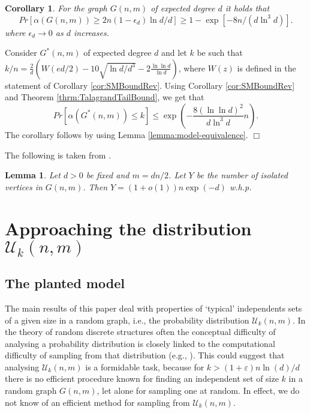 \documentclass[a4paper,10pt]{article}
\makeatletter
\newtheorem{corollary}{Corollary}\renewcommand{\thecorollary}{\arabic{corollary}}
\newtheorem{lemma}{Lemma}\renewcommand{\thelemma}{\arabic{lemma}}
\newenvironment{proof}{\noindent{\bf Proof\@:}}{\hfill $\Box$\\}
\newcommand\cU{\mathcal{U}}
\newcommand\eps{\varepsilon}
\newcommand{\whp}{w.h.p.}
\makeatother
\begin{document}
\begin{corollary}\label{cor:ExistenceGnm}
For the graph $G(n,m)$ of expected degree $d$ it holds that
\begin{displaymath}
Pr\left[\alpha(G(n,m))\geq 2n(1-\epsilon_d){\ln d}/{d} \right]
\geq 1-\exp \left[-{8n}/(d\ln^3 d) \right]. 
\end{displaymath}
where $\epsilon_d\to0$ as $d$ increases.
\end{corollary}
\begin{proof}
Consider $G^*(n,m)$ of expected degree $d$ and let $k$ be such that
$k/n=\frac{2}{d}\left(W(ed/2)-10\sqrt{\ln d/d^3}-2\frac{\ln\ln d}{\ln d}\right)$, 
where $W(z)$ is defined in the statement of Corollary \ref{cor:SMBoundRev}. 
Using Corollary \ref{cor:SMBoundRev} and Theorem \ref{thrm:TalagrandTailBound}, 
we get that
\begin{displaymath}
Pr\left[\alpha(G^*(n,m))\leq k \right] \leq \exp \left(-\frac{8(\ln\ln d)^2}{d\ln^3 d}n \right).
\end{displaymath}
The corollary follows by using Lemma \ref{lemma:model-equivalence}.
\end{proof}


\noindent
The following is taken from \cite[p.~156]{janson}.

\begin{lemma}\label{Lemma_isoGnm}
Let $d>0$ be fixed and $m=dn/2$.
Let $Y$ be the number of isolated vertices in $G(n,m)$.
Then $Y=(1+o(1))n\exp(-d)$ \whp
\end{lemma}





\section{Approaching the distribution $\cU_k(n,m)$}\label{sec:PlantedModel}


\subsection{The planted model}

The main results of this paper deal with properties of `typical'
independents sets of a given size in a random graph, i.e., the
probability distribution $\cU_k(n,m)$. In the theory of random
discrete structures often the conceptual difficulty of analysing
a probability distribution is closely linked to the computational
difficulty of sampling from that distribution (e.g., \cite[Chapter~9]{janson}).
This could suggest that analysing $\cU_k(n,m)$ is a formidable task,
because for $k>(1+\eps)n\ln(d)/d$ there is no efficient procedure known
for finding an independent set of size $k$ in a random graph $G(n,m)$,
let alone for sampling one at random. In effect, we do not know of
an efficient method for sampling from $\cU_k(n,m)$.
\end{document}
